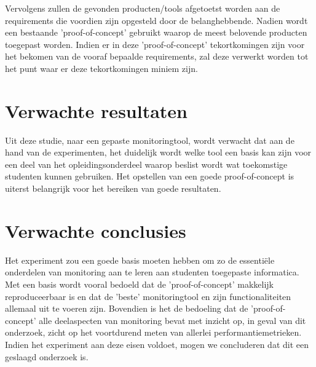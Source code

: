 Vervolgens zullen de gevonden producten/tools afgetoetst worden aan de requirements die voordien zijn opgesteld door de belanghebbende. Nadien wordt een bestaande 'proof-of-concept' gebruikt \autocite{Cedric2019} waarop de meest belovende producten toegepast worden. Indien er in deze 'proof-of-concept' tekortkomingen zijn voor het bekomen van de vooraf bepaalde requirements, zal deze verwerkt worden tot het punt waar er deze tekortkomingen miniem zijn. 

\section{Verwachte resultaten}
\label{sec:verwachte_resultaten}

Uit deze studie, naar een gepaste monitoringtool, wordt verwacht dat aan de hand van de experimenten, het duidelijk wordt welke tool een basis kan zijn voor een deel van het opleidingsonderdeel waarop beslist wordt wat toekomstige studenten kunnen gebruiken. Het opstellen van een goede proof-of-concept is uiterst belangrijk voor het bereiken van goede resultaten.

\section{Verwachte conclusies}
\label{sec:verwachte_conclusies}

Het experiment zou een goede basis moeten hebben om zo de essentiële onderdelen van monitoring aan te leren aan studenten toegepaste informatica. Met een basis wordt vooral bedoeld dat de 'proof-of-concept' makkelijk reproduceerbaar is en dat de 'beste' monitoringtool en zijn functionaliteiten allemaal uit te voeren zijn. Bovendien is het de bedoeling dat de 'proof-of-concept' alle deelaspecten van monitoring bevat met inzicht op, in geval van dit onderzoek, zicht op het voortdurend meten van allerlei performantiemetrieken. Indien het experiment aan deze eisen voldoet, mogen we concluderen dat dit een geslaagd onderzoek is.


